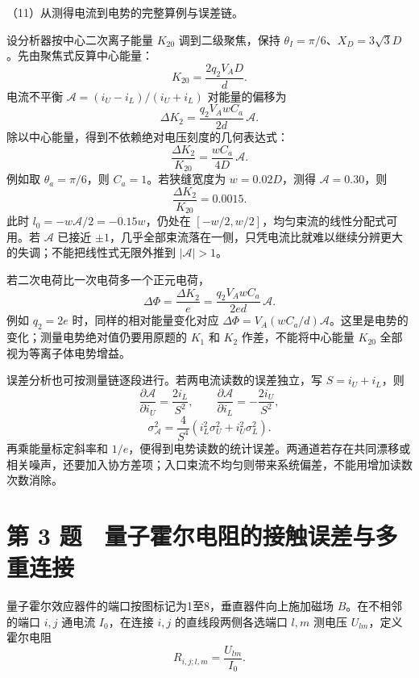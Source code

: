 \documentclass[12pt,a4paper,fontset=fandol]{ctexart}
\begin{document}
（11）从测得电流到电势的完整算例与误差链。

设分析器按中心二次离子能量 \(K_{20}\) 调到二级聚焦，保持
\(\theta_I=\pi/6\)、\(X_D=3\sqrt3D\)。先由聚焦式反算中心能量： \[
K_{20}=\frac{2q_2V_AD}{d}.
\] 电流不平衡 \(\mathcal A=(i_U-i_L)/(i_U+i_L)\) 对能量的偏移为 \[
\Delta K_2=\frac{q_2V_AwC_a}{2d}\,\mathcal A.
\] 除以中心能量，得到不依赖绝对电压刻度的几何表达式： \[
\boxed{\frac{\Delta K_2}{K_{20}}
=\frac{wC_a}{4D}\,\mathcal A.}
\] 例如取 \(\theta_a=\pi/6\)，则 \(C_a=1\)。若狭缝宽度为
\(w=0.02D\)，测得 \(\mathcal A=0.30\)，则 \[
\frac{\Delta K_2}{K_{20}}=0.0015.
\] 此时 \(l_0=-w\mathcal A/2=-0.15w\)，仍处在
\([-w/2,w/2]\)，均匀束流的线性分配式可用。若 \(\mathcal A\) 已接近
\(\pm1\)，几乎全部束流落在一侧，只凭电流比就难以继续分辨更大的失调；不能把线性式无限外推到
\(|\mathcal A|>1\)。

\noindent\begin{minipage}{\linewidth}
若二次电荷比一次电荷多一个正元电荷， \[
\Delta\Phi=\frac{\Delta K_2}{e}
=\frac{q_2V_AwC_a}{2ed}\,\mathcal A.
\] 例如 \(q_2=2e\) 时，同样的相对能量变化对应
\(\Delta\Phi=V_A(wC_a/d)\mathcal A\)。这里是电势的变化；测量电势绝对值仍要用原题的
\(K_1\) 和 \(K_2\) 作差，不能将中心能量 \(K_{20}\)
全部视为等离子体电势增益。

误差分析也可按测量链逐段进行。若两电流读数的误差独立，写
\(S=i_U+i_L\)，则 \[
\frac{\partial\mathcal A}{\partial i_U}=\frac{2i_L}{S^2},\qquad
\frac{\partial\mathcal A}{\partial i_L}=-\frac{2i_U}{S^2},
\] \[
\sigma_{\mathcal A}^2
=\frac{4}{S^4}\left(i_L^2\sigma_U^2+i_U^2\sigma_L^2\right).
\] 再乘能量标定斜率和
\(1/e\)，便得到电势读数的统计误差。两通道若存在共同漂移或相关噪声，还要加入协方差项；入口束流不均匀则带来系统偏差，不能用增加读数次数消除。


\end{minipage}

\clearpage

\section{第 3
题　量子霍尔电阻的接触误差与多重连接}\label{ux7b2c-3-ux9898-ux91cfux5b50ux970dux5c14ux7535ux963bux7684ux63a5ux89e6ux8befux5deeux4e0eux591aux91cdux8fdeux63a5}

量子霍尔效应器件的端口按图标记为1至8，垂直器件向上施加磁场
\(B\)。在不相邻的端口 \(i,j\) 通电流 \(I_0\)，在连接 \(i,j\)
的直线段两侧各选端口 \(l,m\) 测电压 \(U_{lm}\)，定义霍尔电阻 \[
R_{i,j;l,m}=\frac{U_{lm}}{I_0}.
\]
\end{document}
